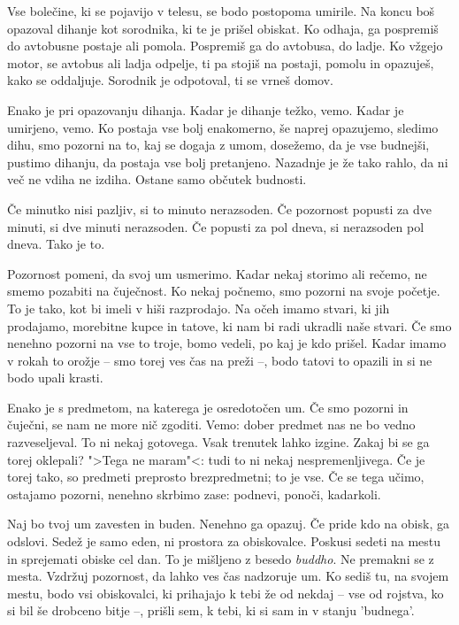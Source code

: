 Vse bolečine, ki se pojavijo v telesu, se bodo postopoma umirile. Na koncu boš opazoval dihanje kot sorodnika, ki te je prišel obiskat. Ko odhaja, ga pospremiš do avtobusne postaje ali pomola. Pospremiš ga do avtobusa, do ladje. Ko vžgejo motor, se avtobus ali ladja odpelje, ti pa stojiš na postaji, pomolu in opazuješ, kako se oddaljuje. Sorodnik je odpotoval, ti se vrneš domov.

Enako je pri opazovanju dihanja. Kadar je dihanje težko, vemo. Kadar je umirjeno, vemo. Ko postaja vse bolj enakomerno, še naprej opazujemo, sledimo dihu, smo pozorni na to, kaj se dogaja z umom, dosežemo, da je vse budnejši, pustimo dihanju, da postaja vse bolj pretanjeno. Nazadnje je že tako rahlo, da ni več ne vdiha ne izdiha. Ostane samo občutek budnosti.

\clearpage


Če minutko nisi pazljiv, si to minuto nerazsoden. Če pozornost popusti za dve minuti, si dve minuti nerazsoden. Če popusti za pol dneva, si nerazsoden pol dneva. Tako je to.

Pozornost pomeni, da svoj um usmerimo. Kadar nekaj storimo ali rečemo, ne smemo pozabiti na čuječnost. Ko nekaj počnemo, smo pozorni na svoje početje. To je tako, kot bi imeli v hiši razprodajo. Na očeh imamo stvari, ki jih prodajamo, morebitne kupce in tatove, ki nam bi radi ukradli naše stvari. Če smo nenehno pozorni na vse to troje, bomo vedeli, po kaj je kdo prišel. Kadar imamo v rokah to orožje – smo torej ves čas na preži –, bodo tatovi to opazili in si ne bodo upali krasti.

Enako je s predmetom, na katerega je osredotočen um. Če smo pozorni in čuječni, se nam ne more nič zgoditi. Vemo: dober predmet nas ne bo vedno razveseljeval. To ni nekaj gotovega. Vsak trenutek lahko izgine. Zakaj bi se ga torej oklepali? ">Tega ne maram"<: tudi to ni nekaj nespremenljivega. Če je torej tako, so predmeti preprosto brezpredmetni; to je vse. Če se tega učimo, ostajamo pozorni, nenehno skrbimo zase: podnevi, ponoči, kadarkoli.

\clearpage


Naj bo tvoj um zavesten in buden. Nenehno ga opazuj. Če pride kdo na obisk, ga odslovi. Sedež je samo eden, ni prostora za obiskovalce. Poskusi sedeti na mestu in sprejemati obiske cel dan. To je mišljeno z besedo \emph{buddho}. Ne premakni se z mesta. Vzdržuj pozornost, da lahko ves čas nadzoruje um. Ko sediš tu, na svojem mestu, bodo vsi obiskovalci, ki prihajajo k tebi že od nekdaj – vse od rojstva, ko si bil še drobceno bitje –, prišli sem, k tebi, ki si sam in v stanju 'budnega'.

